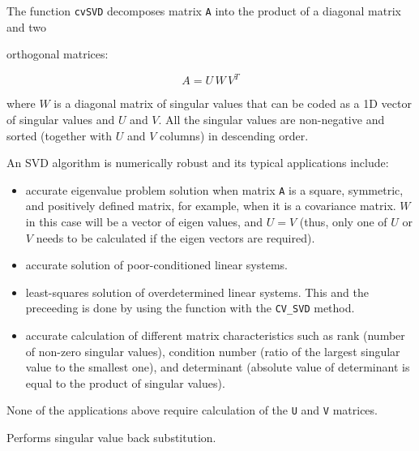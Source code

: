 The function \texttt{cvSVD} decomposes matrix \texttt{A} into the product of a diagonal matrix and two 

orthogonal matrices:

\[
A=U \, W \, V^T
\]

where $W$ is a diagonal matrix of singular values that can be coded as a
1D vector of singular values and $U$ and $V$. All the singular values
are non-negative and sorted (together with $U$ and $V$ columns)
in descending order.

An SVD algorithm is numerically robust and its typical applications include:

\begin{itemize}
  \item accurate eigenvalue problem solution when matrix \texttt{A}
  is a square, symmetric, and positively defined matrix, for example, when
  it is a covariance matrix. $W$ in this case will be a vector
  of eigen values, and $U = V$
  (thus, only one of $U$ or $V$ needs to be calculated if
  the eigen vectors are required).
  \item accurate solution of poor-conditioned linear systems.
  \item least-squares solution of overdetermined linear systems. This and the preceeding is done by using the  function with the \texttt{CV\_SVD} method.
  \item accurate calculation of different matrix characteristics such as rank (number of non-zero singular values), condition number (ratio of the largest singular value to the smallest one), and determinant (absolute value of determinant is equal to the product of singular values). 
\end{itemize}

None of the applications above require calculation of the \texttt{U} and \texttt{V} matrices.

\label{SVBkSb}

Performs singular value back substitution.


